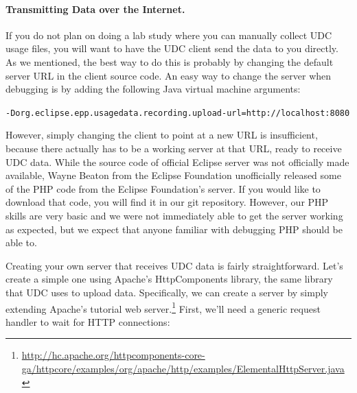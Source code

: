 \paragraph{Transmitting Data over the Internet.}

If you do not plan on doing a lab study where you can manually collect UDC usage
files, you will want to have the UDC client send the data to you directly.
As we mentioned, the best way to do this is probably by changing the default
server URL in the client source code.
An easy way to change the server when debugging is by adding the following Java
virtual machine arguments:

\vspace{4mm}
\texttt{-Dorg.eclipse.epp.usagedata.recording.upload-url=http://localhost:8080}
\vspace{4mm}

\noindent
However, simply changing the client to point at a new URL is insufficient, 
because there actually has to be a working server at that URL, ready to 
receive UDC data.
While the source code of official Eclipse server was not officially made 
available, Wayne Beaton from the Eclipse Foundation unofficially released
some of the PHP code from the Eclipse Foundation's server.
If you would like to download that code, you will find it in our git repository.
However, our PHP skills are very basic and we were not immediately able
to get the server working as expected, but we expect that anyone familiar with
debugging PHP should be able to.

\newpage

Creating your own server that receives UDC data is fairly straightforward.
Let's create a simple one using Apache's HttpComponents library,
the same library that UDC uses to upload data.
Specifically, we can create a server by simply extending Apache's tutorial
web server.\footnote{\url{http://hc.apache.org/httpcomponents-core-ga/httpcore/examples/org/apache/http/examples/ElementalHttpServer.java}}
First, we'll need a generic request handler to wait for HTTP connections:

